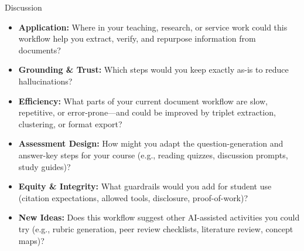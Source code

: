 \documentclass[aspectratio=169]{beamer}
\begin{document}
\begin{frame}{Discussion}
\begin{itemize}
  \item \textbf{Application:} Where in your teaching, research, or service work could this workflow help you extract, verify, and repurpose information from documents?
  \item \textbf{Grounding \& Trust:} Which steps would you keep exactly as-is to reduce hallucinations?
  \item \textbf{Efficiency:} What parts of your current document workflow are slow, repetitive, or error-prone—and could be improved by triplet extraction, clustering, or format export?
  \item \textbf{Assessment Design:} How might you adapt the question-generation and answer-key steps for your course (e.g., reading quizzes, discussion prompts, study guides)?
  \item \textbf{Equity \& Integrity:} What guardrails would you add for student use (citation expectations, allowed tools, disclosure, proof-of-work)?
  \item \textbf{New Ideas:} Does this workflow suggest other AI-assisted activities you could try (e.g., rubric generation, peer review checklists, literature review, concept maps)?
\end{itemize}
\end{frame}
\end{document}
